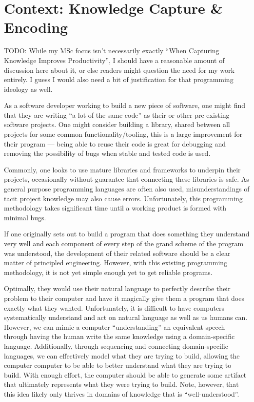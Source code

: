 \section{Context: Knowledge Capture \& Encoding}

TODO: While my MSc focus isn't necessarily exactly ``When Capturing Knowledge
Improves Productivity'', I should have a reasonable amount of discussion here
about it, or else readers might question the need for my work entirely. I guess
I would also need a bit of justification for that programming ideology as well.

As a software developer working to build a new piece of software, one might
find that they are writing ``a lot of the same code'' as their or other
pre-existing software projects. One might consider building a library, shared
between all projects for some common functionality/tooling, this is a large
improvement for their program --- being able to reuse their code is great for
debugging and removing the possibility of bugs when stable and tested code is
used.


Commonly, one looks to use mature libraries and frameworks to underpin their
projects, occasionally without guarantee that connecting these libraries is safe.
As general purpose programming languages are often also used, misunderstandings
of tacit project knowledge may also cause errors. Unfortunately, this
programming methodology takes significant time until a working product is formed
with minimal bugs.

If one originally sets out to build a program that does something they
understand very well and each component of every step of the grand scheme of the
program was understood, the development of their related software should be a
clear matter of principled engineering. However, with this existing programming
methodology, it is not yet simple enough yet to get reliable programs.

Optimally, they would use their natural language to perfectly describe their
problem to their computer and have it magically give them a program that does
exactly what they wanted. Unfortunately, it is difficult to have computers
systematically understand and act on natural language as well as us humans can.
However, we can mimic a computer ``understanding'' an equivalent speech through
having the human write the same knowledge using a domain-specific language.
Additionally, through sequencing and connecting domain-specific languages, we
can effectively model what they are trying to build, allowing the computer
computer to be able to better understand what they are trying to build. With
enough effort, the computer should be able to generate some artifact that
ultimately represents what they were trying to build. Note, however, that this idea likely only
thrives in domains of knowledge that is ``well\hyp{}understood''.


